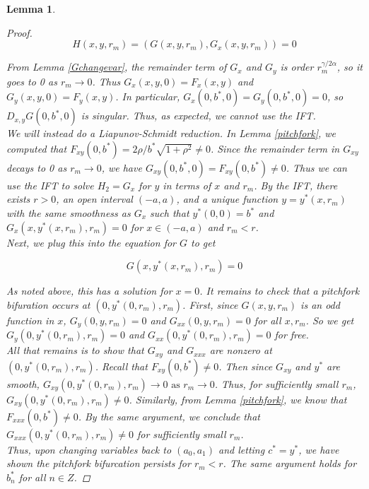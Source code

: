 \documentclass[12pt]{article}
\newtheorem{lemma}{Lemma}
\begin{document}
\begin{lemma}
\begin{proof}
\begin{equation}
H(x,y,r_m) = (G(x,y,r_m), G_x(x,y,r_m)) = 0
\end{equation}

From Lemma \ref{Gchangevar}, the remainder term of $G_x$ and $G_y$ is order $r_m^{\gamma/2 \alpha}$, so it goes to 0 as $r_m \rightarrow 0$. Thus $G_x(x,y,0) = F_x(x,y)$ and $G_y(x,y,0) = F_y(x,y)$. In particular, $G_x(0,b^*,0) = G_y(0, b^*, 0) = 0$, so $D_{x,y}G(0,b^*,0)$ is singular. Thus, as expected, we cannot use the IFT.\\

We will instead do a Liapunov-Schmidt reduction. In Lemma \ref{pitchfork}, we computed that $F_{xy}(0, b^*) = 2 \rho/b^* \sqrt{1+ \rho^2} \neq 0$. Since the remainder term in $G_{xy}$ decays to 0 as $r_m \rightarrow 0$, we have $G_{xy}(0, b^*, 0) = F_{xy}(0, b^*) \neq 0$. Thus we can use the IFT to solve $H_2 = G_x$ for $y$ in terms of $x$ and $r_m$. By the IFT, there exists $r > 0$, an open interval $(-a, a)$, and a unique function $y = y^*(x, r_m)$ with the same smoothness as $G_x$ such that $y^*(0, 0) = b^*$ and $G_x(x, y^*(x, r_m), r_m) = 0$ for $x \in (-a, a)$ and $r_m < r$.\\

Next, we plug this into the equation for $G$ to get

\begin{equation}
G(x, y^*(x, r_m), r_m) = 0
\end{equation}

As noted above, this has a solution for $x = 0$. It remains to check that a pitchfork bifuration occurs at $(0, y^*(0, r_m), r_m)$. First, since $G(x, y, r_m)$ is an odd function in $x$, $G_y(0, y, r_m) = 0$ and $G_{xx}(0, y, r_m) = 0$ for all $x, r_m$. So we get $G_y(0, y^*(0, r_m), r_m) = 0$ and $G_{xx}(0, y^*(0, r_m), r_m) = 0$ for free.\\

All that remains is to show that $G_{xy}$ and $G_{xxx}$ are nonzero at $(0, y^*(0, r_m), r_m)$. Recall that $F_{xy}(0, b^*) \neq 0$. Then since $G_{xy}$ and $y^*$ are smooth, $G_{xy}(0, y^*(0, r_m), r_m) \rightarrow 0 \text{ as } r_m \rightarrow 0$. Thus, for sufficiently small $r_m$, $G_{xy}(0, y^*(0, r_m), r_m) \neq 0$. Similarly, from Lemma \ref{pitchfork}, we know that $F_{xxx}(0, b^*) \neq 0$. By the same argument, we conclude that $G_{xxx}(0, y^*(0, r_m), r_m) \neq 0$ for sufficiently small $r_m$.\\

Thus, upon changing variables back to $(a_0, a_1)$ and letting $c^* = y^*$, we have shown the pitchfork bifurcation persists for $r_m < r$. The same argument holds for $b^*_n$ for all $n \in Z$. 

\end{proof}
\end{lemma}
\end{document}
